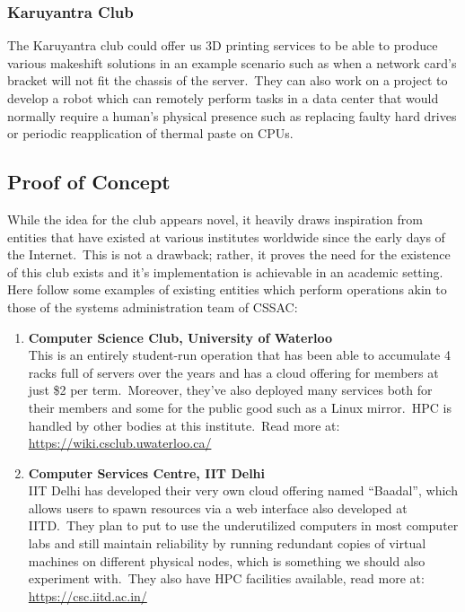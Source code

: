 \documentclass[a4paper,11pt,twocolumn,oneside]{book}
\begin{document}
    \subsubsection{Karuyantra Club}
    The Karuyantra club could offer us 3D printing services to be able to produce various makeshift solutions in an
    example scenario such as when a network card's bracket will not fit the chassis of the server.\ They can also
    work on a project to develop a robot which can remotely perform tasks in a data center that would normally require a
    human's physical presence such as replacing faulty hard drives or periodic reapplication of thermal paste on CPUs.


    \subsection{Proof of Concept}\label{subsec:proof-of-concept}

    While the idea for the club appears novel, it heavily draws inspiration from entities that have existed at various
    institutes worldwide since the early days of the Internet.\ This is not a drawback; rather, it proves the need for
    the existence of this club exists and it's implementation is achievable in an academic setting.
    \\
    Here follow some examples of existing entities which perform operations akin to those of the systems administration
    team of CSSAC:

    \begin{enumerate}
        \item \textbf{Computer Science Club, University of Waterloo}\\
        This is an entirely student-run operation that has been able to accumulate 4 racks full of servers over the
        years and has a cloud offering for members at just \$2 per term.\ Moreover, they've also deployed many services
        both for their members and some for the public good such as a Linux mirror.\ HPC is handled by other bodies at
        this institute.\ Read more at:\\
        \href{https://wiki.csclub.uwaterloo.ca/}{\color{blue}\url{https://wiki.csclub.uwaterloo.ca/}}

        \item \textbf{Computer Services Centre, IIT Delhi}\\
        IIT Delhi has developed their very own cloud offering named ``Baadal'', which allows users to spawn resources
        via a web interface also developed at IITD.\ They plan to put to use the underutilized computers in most
        computer labs and still maintain reliability by running redundant copies of virtual machines on different
        physical nodes, which is something we should also experiment with.\ They also have HPC facilities available,
        read more at:\\
        \href{https://csc.iitd.ac.in/}{\color{blue}\url{https://csc.iitd.ac.in/}}
    \end{enumerate}
\end{document}
